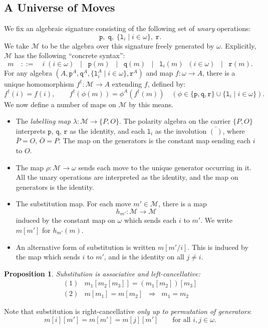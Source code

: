 \documentclass[a4paper,11pt]{article}
\newtheorem{proposition}{Proposition}[section]
\newcommand{\al}{\mathtt{p}}
\newcommand{\ar}{\mathtt{q}}
\newcommand{\fr}{\mathtt{r}}
\newcommand{\fl}[1]{\mathtt{l}_{#1}}
\newcommand{\hext}[1]{#1^{\dagger}}
\newcommand{\MM}{\mathcal{M}}
\begin{document}
\subsection{A Universe of Moves}
We fix an algebraic signature consisting of the following set of
\emph{unary} operations:
\[ \al , \; \ar , \; \{ \fl{i} \mid i \in \omega \} , \; \fr . \]
We take $\MM$ to be the algebra over this signature freely generated
by $\omega$. Explicitly, $\MM$ has the following ``concrete syntax'':
\[ m \quad ::= \quad i \; (i \in \omega ) \;\; \mid \;\; \al (m) \;\;
\mid \;\; \ar (m) \;\; \mid \;\;
\fl{i} (m) \;\; (i \in \omega ) \;\; \mid \;\; \fr (m) . \]
For any algebra $(A, \al^A , \ar^A , \{ \fl{i}^A \mid i \in \omega \}
, \fr^A )$ and map $f : \omega \longrightarrow A$, there is a unique
homomorphism $ \hext{f} : \MM \longrightarrow A$ extending $f$, defined
by:
\[ \hext{f}(i) = f(i), \qquad \hext{f}(\phi (m)) = \phi^A (\hext{f}(m))
\quad (\phi \in \{ \al , \ar , \fr \} \cup \{ \fl{i} \mid i \in \omega
\} ). \]
We now define a number of maps on $\MM$ by this means.
\begin{itemize}
\item
The \emph{labelling map} $\lambda : \MM \longrightarrow \{ P, O \}$.
The polarity algebra on the carrier $\{ P, O \}$ interprets $\al$,
$\ar$, $\fr$ as the identity, and each $\fl{i}$ as the involution
$\bar{(\ )}$, where $\bar{P} = O$, $\bar{O} = P$. The map on the
generators is the constant map sending each $i$ to $O$.

\item
The map $\rho : \MM \longrightarrow \omega$ sends each move to the
unique generator occurring in it. All the unary operations are
interpreted as the identity, and the map on generators is the
identity.

\item
The substitution map. For each move $m' \in \MM$, there is a map
\[ h_{m'} : \MM \longrightarrow \MM \]
induced by the constant map on $\omega$ which sends each $i$ to
$m'$. We write $m[m']$ for $h_{m'}(m)$.

\item
An alternative form of substitution is written $m[m'/i]$. This is
induced by the map which sends $i$ to $m'$, and is the identity on
all $j \neq i$.
\end{itemize}

\begin{proposition}
Substitution is associative and left-cancellative:
\[ \begin{array}{ll}
(1) & m_1[m_2[m_3]] = (m_1[m_2])[m_3] \\
(2) & m[m_1] = m[m_2] \;\; \Longrightarrow \;\; m_1 = m_2
\end{array} \]
\end{proposition}
Note that substitution is right-cancellative \emph{only up to
  permutation of generators}:
\[ m[i][m'] = m[m'] = m[j][m'] \qquad \mbox{for all $i, j \in
  \omega$}. \]
\end{document}
